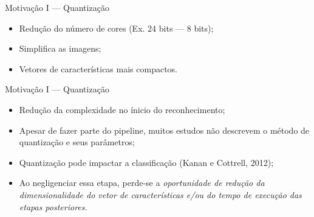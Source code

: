 \documentclass[10pt]{beamer}
\begin{document}
\begin{frame}{Motivação I --- Quantização}
  \setlength\leftmargini{1em}
    \begin{figure}[htbp]
    \begin{center}
      \hspace{1.5cm}
    \end{center}
  \end{figure}
  \begin{itemize}
    \item Redução do número de cores (Ex. 24 bits --- 8 bits);
    \item Simplifica as imagens;
    \item Vetores de características mais compactos.
  \end{itemize}
\end{frame}
\begin{frame}{Motivação I --- Quantização}
  \setlength\leftmargini{1em}
  \begin{itemize}
        \item Redução da complexidade no ínicio do reconhecimento;
    \item Apesar de fazer parte do pipeline, muitos estudos não descrevem o método de quantização e seus parâmetros;
    \item Quantização pode impactar a classificação (Kanan e Cottrell, 2012);
    \item Ao negligenciar essa etapa, perde-se a \textit{oportunidade de redução da dimensionalidade do vetor de características e/ou do tempo de execução das etapas posteriores.}
  \end{itemize}
\end{frame}
\end{document}
